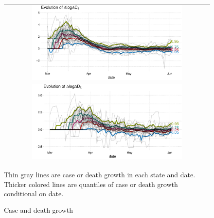 \documentclass[11pt,reqno,letter]{amsart}
\theoremstyle{definition}
\begin{document}




\begin{figure}[!ht]\caption{Case and death growth \label{fig:growthq}}
  \centering
  \begin{minipage}{\textwidth}
    \centering
    \begin{tabular}{c}
      \includegraphics[width=0.75\textwidth]{tables_and_figures/casequantiles}
      \\
      \includegraphics[width=0.75\textwidth]{tables_and_figures/deathquantiles}
    \end{tabular}
  \end{minipage}
     \begin{flushleft}
      \footnotesize Thin gray lines are case or death growth in each
      state and date. Thicker colored lines are quantiles of case or
      death growth conditional on date.      \end{flushleft}
\end{figure}
\end{document}
